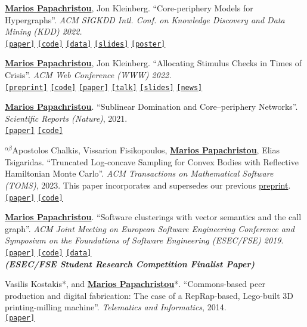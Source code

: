 \documentclass[margin]{res}
\newcommand{\alphabeticalorder}[0]{\ensuremath {^{\alpha \beta}}}
\newcommand{\specialurl}[2]{\href {#2} {\texttt{[#1]}}}
\newcommand{\preprint}[1]{\specialurl {preprint} {#1}}
\newcommand{\code}[1]{\specialurl {code} {#1}}
\newcommand{\data}[1]{\specialurl {data} {#1}}
\newcommand{\talk}[1]{\specialurl {talk} {#1}}
\newcommand{\slides}[1]{\specialurl {slides} {#1}}
\newcommand{\poster}[1]{\specialurl {poster} {#1}}
\newcommand{\paper}[1]{\specialurl {paper} {#1}}
\newcommand{\authorref}[1]{\underline {\textbf{#1}}}
\newcommand{\news}[1]{\specialurl {news} {#1}}
\newcommand{\authorme}{\authorref{Marios Papachristou}}
\begin{document}
\begin{resume}
\begin{enumerate}[nosep, label={[P\arabic*]}]
   \item \authorme, Jon Kleinberg. ``Core-periphery Models for Hypergraphs''. \emph{ACM SIGKDD Intl. Conf. on Knowledge Discovery and Data Mining (KDD) 2022.} \\
   \paper{https://arxiv.org/abs/2206.00783} \code{https://doi.org/10.5281/zenodo.5965849} \data{https://doi.org/10.5281/zenodo.5943043} \slides{https://drive.google.com/file/d/1k9pjPaeDtg7jhUivjlEmyunimcUb-DxL/view?usp=sharing} \poster{https://drive.google.com/file/d/1RJ3C7KKhTemfj5OBAiEXUHMVp-TJhTDs/view?usp=sharing}
   \item  \authorme, Jon Kleinberg. ``Allocating Stimulus Checks in Times of Crisis''. \emph{ACM Web Conference (WWW) 2022.} \\\preprint{https://arxiv.org/abs/2106.07560} \code{https://github.com/papachristoumarios/financial-contagion} \paper{https://doi.org/10.1145/3485447.3512047} \talk{https://youtu.be/WUmPBztK8Mo} \slides{https://drive.google.com/file/d/1v4v4jPOTzFtP8a5dhAFLoIjZSRDxAjBz/view?usp=sharing} \news{https://www.minneapolisfed.org/article/2022/social-policy-in-the-age-of-algorithms-an-interview-with-jon-kleinberg}   
   \item \authorme. ``Sublinear Domination and Core--periphery Networks''. \emph{Scientific Reports (Nature)}, 2021. \\ \paper{http://www.nature.com/articles/s41598-021-94105-8} \code{https://bit.ly/3wKNGI0} 
    \item \alphabeticalorder Apostolos Chalkis, Vissarion Fisikopoulos, \authorme, Elias Tsigaridas. ``Truncated Log-concave Sampling for Convex Bodies with Reflective Hamiltonian Monte Carlo''.   \emph{ACM Transactions on Mathematical Software (TOMS)}, 2023. This paper incorporates and supersedes our previous \href{https://arxiv.org/abs/2102.13068}{preprint}. \\ \paper{https://doi.org/10.1145/3589505} \code{https://github.com/GeomScale/volume_approximation}
    \item \authorme. ``Software clusterings with vector semantics and the call graph''. \emph{ACM Joint Meeting on European Software Engineering Conference and Symposium on the Foundations of Software Engineering (ESEC/FSE) 2019}. \\ \paper{https://dl.acm.org/citation.cfm?id=3342483} \code{https://github.com/papachristoumarios/sade} \data{http://doi.org/10.5281/zenodo.2652487} \\\textbf{\emph{(ESEC/FSE Student Research Competition Finalist Paper)}}
    \item Vasilis Kostakis*, and \authorme*. ``Commons-based peer production and digital fabrication: The case of a RepRap-based, Lego-built 3D printing-milling machine''. \emph{Telematics and Informatics}, 2014. \\ \paper{https://bit.ly/2JRoisV} 
    

\end{enumerate}
\end{resume}
\end{document}
